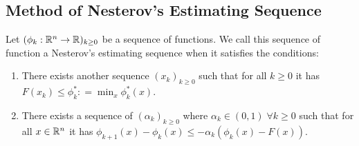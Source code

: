 \documentclass[12pt]{article}
\begin{document}
    \subsection{Method of Nesterov's Estimating Sequence}
        \begin{definition}\label{def:nes-est-seq}
            Let $(\phi_k : \mathbb R^n \rightarrow\mathbb R)_{k \ge 0}$ be a sequence of functions. 
            We call this sequence of function a Nesterov's estimating sequence when it satisfies the conditions: 
            \begin{enumerate}
                \item There exists another sequence $(x_k)_{k \ge 0}$ such that for all $k \ge 0$ it has $F(x_k) \le \phi_k^*: =\min_{x}\phi_k^*(x)$. 
                \item There exists a sequence of $(\alpha_k)_{k \ge 0}$ where $\alpha_k \in (0, 1)\; \forall k \ge0 $ such that for all $x \in \mathbb R^n$ it has $\phi_{k + 1}(x) - \phi_k(x) \le - \alpha_k(\phi_k(x) - F(x))$. 
            \end{enumerate}
        \end{definition}
\end{document}
